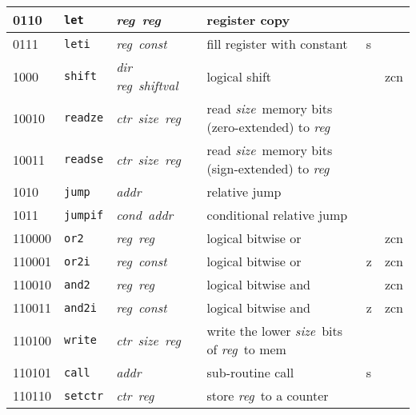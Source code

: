 \documentclass[architecture]{compas2018}
\newcommand{\reg}{\textit{reg}}
\newcommand{\const}{\textit{const}}
\newcommand{\shiftval}{\textit{shiftval}}
\newcommand{\cond}{\textit{cond}}
\newcommand{\ctr}{\textit{ctr}}
\newcommand{\size}{\textit{size}}
\newcommand{\addr}{\textit{addr}}
\begin{document}
\begin{table}[!h]
\begin{center}
\begin{tabular}{|l|l|l|l|l|c|}
    0110    & \texttt{let}    & \reg\ \reg\                   & register copy                                        &      &             \\
    \hline
    0111    & \texttt{leti}   & \reg\ \const\                 & fill register with constant                          & s    &             \\
    \hline
    1000    & \texttt{shift}  & \textit{dir} \reg\ \shiftval\ & logical shift                                        &      & zcn         \\
    \hline
    10010   & \texttt{readze} & \ctr\ \size\ \reg\            & read \size\ memory bits (zero-extended) to \reg\     &      &             \\
    10011   & \texttt{readse} & \ctr\ \size\ \reg\            & read \size\ memory bits (sign-extended) to \reg\     &      &             \\
    \hline
    1010    & \texttt{jump}   & \addr\                        & relative jump                                        &      &             \\
    \hline
    1011    & \texttt{jumpif} & \cond\ \addr\                 & conditional relative jump                            &      &             \\
    \hline
    110000  & \texttt{or2}    & \reg\ \reg\                   & logical bitwise or                                   &      & zcn         \\
    \hline
    110001  & \texttt{or2i}   & \reg\ \const\                 & logical bitwise or                                   & {z}  & zcn         \\
    \hline
    110010  & \texttt{and2}   & \reg\ \reg\                   & logical bitwise and                                  &      & zcn         \\
    \hline
    110011  & \texttt{and2i}  & \reg\ \const\                 & logical bitwise and                                  & {z}  & zcn         \\
    \hline
    110100  & \texttt{write}  & \ctr\ \size\ \reg\            & write the lower \size\ bits of \reg\ to mem          &      &             \\
    \hline
    110101  & \texttt{call}   & \addr\                        & sub-routine call                                     & s    &             \\
    \hline
    110110  & \texttt{setctr} & \ctr\ \reg\                   & store \reg\ to a counter                             &      &             \\

\end{tabular}
\end{center}
\end{table}
\end{document}
